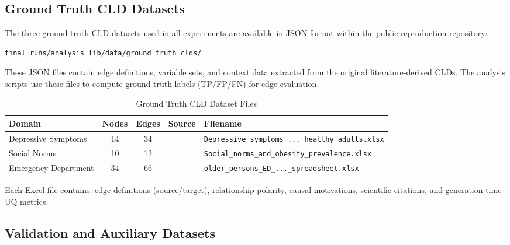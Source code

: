 \subsection{Ground Truth CLD Datasets}

The three ground truth CLD datasets used in all experiments are available in JSON format within the public reproduction repository:
\begin{verbatim}
final_runs/analysis_lib/data/ground_truth_clds/
\end{verbatim}

\noindent These JSON files contain edge definitions, variable sets, and context data extracted from the original literature-derived CLDs. The analysis scripts use these files to compute ground-truth labels (TP/FP/FN) for edge evaluation.

\begin{table}[H]
\centering
\caption{Ground Truth CLD Dataset Files}
\label{tab:gt_files}
\footnotesize
\begin{tabularx}{\textwidth}{@{}l c c l >{\raggedright\arraybackslash}X@{}}
\toprule
\textbf{Domain} & \textbf{Nodes} & \textbf{Edges} & \textbf{Source} & \textbf{Filename} \\
\midrule
Depressive Symptoms & 14 & 34 & \citet{uleman2024triangulation} & \texttt{Depressive\_symptoms\_...\_healthy\_adults.xlsx} \\
Social Norms & 10 & 12 & \citet{crielaard2020socialnorms} & \texttt{Social\_norms\_and\_obesity\_prevalence.xlsx} \\
Emergency Department & 34 & 66 & \citet{smeekes2023emergency} & \texttt{older\_persons\_ED\_...\_spreadsheet.xlsx} \\
\bottomrule
\end{tabularx}
\end{table}

Each Excel file contains: edge definitions (source/target), relationship polarity, causal motivations, scientific citations, and generation-time UQ metrics.

\subsection{Validation and Auxiliary Datasets}

